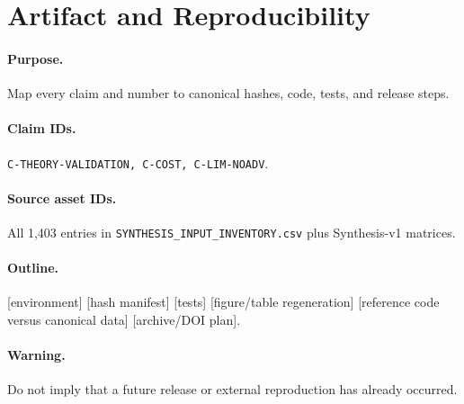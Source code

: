 \section{Artifact and Reproducibility}

\paragraph{Purpose.}
Map every claim and number to canonical hashes, code, tests, and release steps.

\paragraph{Claim IDs.}
\texttt{C-THEORY-VALIDATION, C-COST, C-LIM-NOADV}.

\paragraph{Source asset IDs.}
All 1,403 entries in \texttt{SYNTHESIS\_INPUT\_INVENTORY.csv} plus Synthesis-v1 matrices.

\paragraph{Outline.}
[environment] [hash manifest] [tests] [figure/table regeneration]
[reference code versus canonical data] [archive/DOI plan].

\paragraph{Warning.}
Do not imply that a future release or external reproduction has already occurred.
